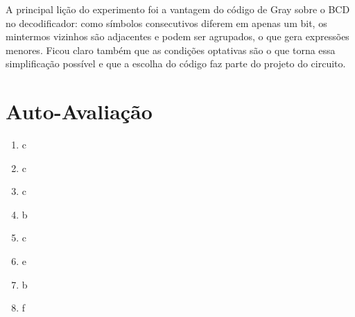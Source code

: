 \documentclass[12pt]{article}
\begin{document}
A principal lição do experimento foi a vantagem do código de Gray sobre o BCD no decodificador: como símbolos consecutivos diferem em apenas um bit, os mintermos vizinhos são adjacentes e podem ser agrupados, o que gera expressões menores. Ficou claro também que as condições optativas são o que torna essa simplificação possível e que a escolha do código faz parte do projeto do circuito.




\newpage 
\section*{Auto-Avaliação}

\begin{enumerate}
    \item c
    \item c
    \item c
    \item b
    \item c
    \item e
    \item b
    \item f
\end{enumerate}
\end{document}
